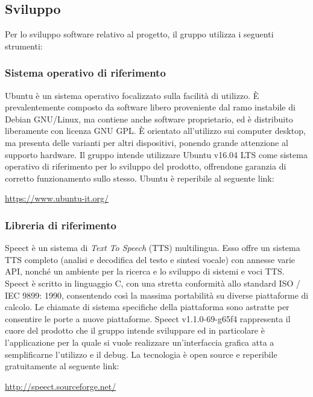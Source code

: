 \documentclass[../NormediProgetto.tex]{subfiles}
\begin{document}

	\subsection{Sviluppo}

	Per lo sviluppo software relativo al progetto, il gruppo utilizza i seguenti strumenti:
	
	\subsubsection{Sistema operativo di riferimento}
	Ubuntu è un sistema operativo focalizzato sulla facilità di utilizzo. È prevalentemente composto da software libero proveniente dal ramo instabile di Debian GNU/Linux, ma contiene anche software proprietario, ed è distribuito liberamente con licenza GNU GPL. È orientato all'utilizzo sui computer desktop, ma presenta delle varianti per altri dispositivi, ponendo grande attenzione al supporto hardware. Il gruppo intende utilizzare Ubuntu v16.04 LTS come sistema operativo di riferimento per lo sviluppo del prodotto, offrendone garanzia di corretto funzionamento sullo stesso. Ubuntu è reperibile al seguente link:
	\begin{center}
		\url{https://www.ubuntu-it.org/}
	\end{center}
	
	\subsubsection{Libreria di riferimento}
	Speect è un sistema di \textit{Text To Speech} (TTS) multilingua. Esso offre un sistema TTS completo (analisi e decodifica del testo e sintesi vocale) con annesse varie API, nonché un ambiente per la ricerca e lo sviluppo di sistemi e voci TTS. Speect è scritto in linguaggio C, con una stretta conformità allo standard ISO / IEC 9899: 1990, consentendo così la massima portabilità su diverse piattaforme di calcolo. Le chiamate di sistema specifiche della piattaforma sono astratte per consentire le porte a nuove piattaforme. Speect v1.1.0-69-g65f4 rappresenta il cuore del prodotto che il gruppo intende sviluppare ed in particolare è l'applicazione per la quale si vuole realizzare un'interfaccia grafica atta a semplificarne l'utilizzo e il debug. La tecnologia è open source e reperibile gratuitamente al seguente link:
	\begin{center}
		\url{http://speect.sourceforge.net/}
	\end{center}
\end{document}

